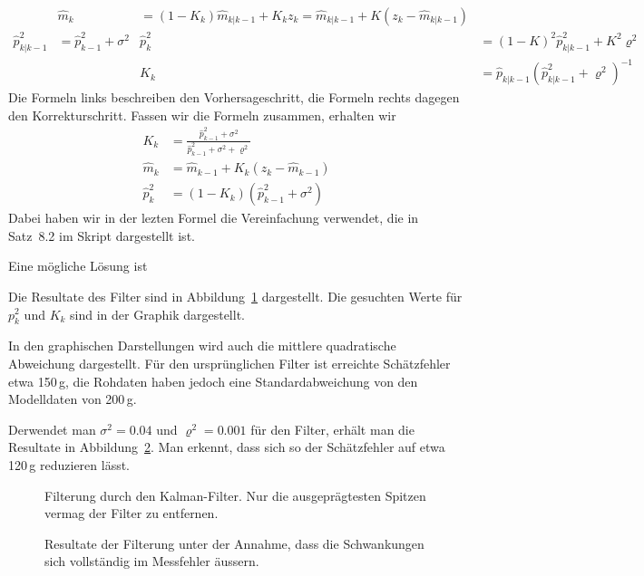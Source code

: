 \begin{loesung}
\begin{teilaufgaben}
\begin{align*}
&
\hat m_k&=(1-K_k)\hat m_{k|k-1} + K_kz_k
=
\hat m_{k|k-1} + K(z_k-\hat m_{k|k-1})
\\
\hat p_{k|k-1}^2&=\hat p_{k-1}^2 + \sigma^2
&
\hat p_k^2&=(1-K)^2\hat p_{k|k-1}^2+K^2\varrho^2
\\
&&
K_k&=\hat p_{k|k-1}(\hat p_{k|k-1}^2+\varrho^2)^{-1}
\end{align*}
Die Formeln links beschreiben den Vorhersageschritt, die Formeln rechts
dagegen den Korrekturschritt.
Fassen wir die Formeln zusammen, erhalten wir
\begin{align*}
K_k
&=
\frac{\hat p_{k-1}^2 + \sigma^2}{\hat p_{k-1}^2+\sigma^2+\varrho^2}
\\
\hat m_k
&=
\hat m_{k-1} + K_k(z_k - \hat m_{k-1})
\\
\hat p_k^2
&=
(1-K_k)(\hat p_{k-1}^2+\sigma^2)
\end{align*}
Dabei haben wir in der lezten Formel die Vereinfachung verwendet, die in
Satz~8.2 im Skript dargestellt ist.
\item
Eine mögliche Lösung ist 
\item
Die Resultate des Filter sind in Abbildung~\ref{90000007:filter1}
dargestellt.
Die gesuchten Werte für $p_k^2$  und $K_k$ sind in der Graphik dargestellt.
\item
In den graphischen Darstellungen wird auch die mittlere quadratische
Abweichung dargestellt.
Für den ursprünglichen Filter ist erreichte Schätzfehler etwa 150\,g,
die Rohdaten haben jedoch eine Standardabweichung von den Modelldaten
von 200\,g.
\item
Derwendet man $\sigma^2=0.04$ und $\varrho^2 = 0.001$ für den Filter,
erhält man die Resultate in Abbildung~\ref{90000007:filter2}.
Man erkennt, dass sich so der Schätzfehler auf etwa 120\,g reduzieren
lässt.
\end{teilaufgaben}
\begin{figure}
\centering
{}
\caption{Filterung durch den Kalman-Filter.
Nur die ausgeprägtesten Spitzen vermag der Filter zu entfernen.
\label{90000007:filter1}
}
\end{figure}
\begin{figure}
\centering
{}
\caption{Resultate der Filterung unter der Annahme, dass die Schwankungen
sich vollständig im Messfehler äussern.
\label{90000007:filter2}
}
\end{figure}
\end{loesung}

